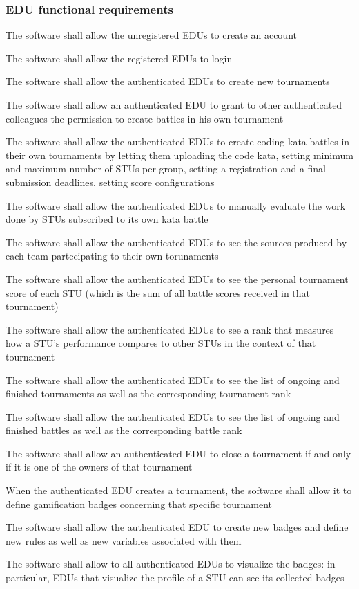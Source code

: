 \subsubsection*{EDU functional requirements}
\begin{requirementsenumerate}
    \item The software shall allow the unregistered EDUs to create an account
    \item The software shall allow the registered EDUs to login
    \item The software shall allow the authenticated EDUs to create new tournaments
    \item The software shall allow an authenticated EDU to grant to other authenticated colleagues the permission to create battles in his own tournament
    \item The software shall allow the authenticated EDUs to create coding kata battles in their own tournaments by letting them uploading the code kata, setting minimum and maximum number of STUs per group, setting a registration and a final submission deadlines, setting score configurations
    \item The software shall allow the authenticated EDUs to manually evaluate the work done by STUs subscribed to its own kata battle
    \item The software shall allow the authenticated EDUs to see the sources produced by each team partecipating to their own torunaments
    \item The software shall allow the authenticated EDUs to see the personal tournament score of each STU (which is the sum of all battle scores received in that tournament)
    \item The software shall allow the authenticated EDUs to see a rank that measures how a STU's performance compares to other STUs in the context of that tournament
    \item The software shall allow the authenticated EDUs to see the list of ongoing and finished tournaments as well as the corresponding tournament rank
    \item The software shall allow the authenticated EDUs to see the list of ongoing and finished battles as well as the corresponding battle rank
    \item The software shall allow an authenticated EDU to close a tournament if and only if it is one of the owners of that tournament
    \item When the authenticated EDU creates a tournament, the software shall allow it to define gamification badges concerning that specific tournament
    \item The software shall allow the authenticated EDU to create new badges and define new rules as well as new variables associated with them
    \item The software shall allow to all authenticated EDUs to visualize the badges: in particular, EDUs that visualize the profile of a STU can see its collected badges
\end{requirementsenumerate}


